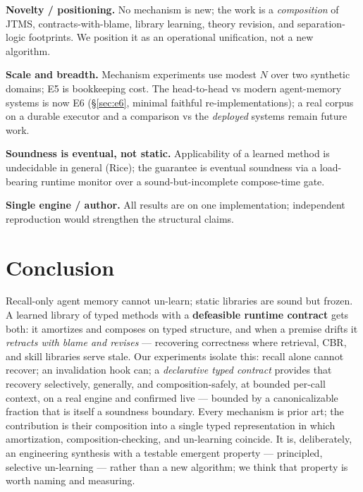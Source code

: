 \documentclass[11pt]{article}
\begin{document}
\textbf{Novelty / positioning.} No mechanism is new; the work is a \emph{composition} of JTMS,
contracts-with-blame, library learning, theory revision, and separation-logic footprints. We position it as an
operational unification, not a new algorithm.

\textbf{Scale and breadth.} Mechanism experiments use modest $N$ over two synthetic domains; E5 is bookkeeping cost.
The head-to-head vs modern agent-memory systems is now E6 (\S\ref{sec:e6}, minimal faithful re-implementations); a
real corpus on a durable executor and a comparison vs the \emph{deployed} systems remain future work.

\textbf{Soundness is eventual, not static.} Applicability of a learned method is undecidable in general (Rice); the
guarantee is eventual soundness via a load-bearing runtime monitor over a sound-but-incomplete compose-time gate.

\textbf{Single engine / author.} All results are on one implementation; independent reproduction would strengthen
the structural claims.

\section{Conclusion}
Recall-only agent memory cannot un-learn; static libraries are sound but frozen. A learned library of typed methods
with a \textbf{defeasible runtime contract} gets both: it amortizes and composes on typed structure, and when a
premise drifts it \emph{retracts with blame and revises} --- recovering correctness where retrieval, CBR, and skill
libraries serve stale. Our experiments isolate this: recall alone cannot recover; an invalidation hook can;
a \emph{declarative typed contract} provides that recovery selectively, generally, and composition-safely, at
bounded per-call context, on a real engine and confirmed live --- bounded by a canonicalizable fraction that is
itself a soundness boundary. Every mechanism is prior art; the contribution is their composition into a single typed
representation in which amortization, composition-checking, and un-learning coincide. It is, deliberately, an
engineering synthesis with a testable emergent property --- principled, selective un-learning --- rather than a new
algorithm; we think that property is worth naming and measuring.
\end{document}
